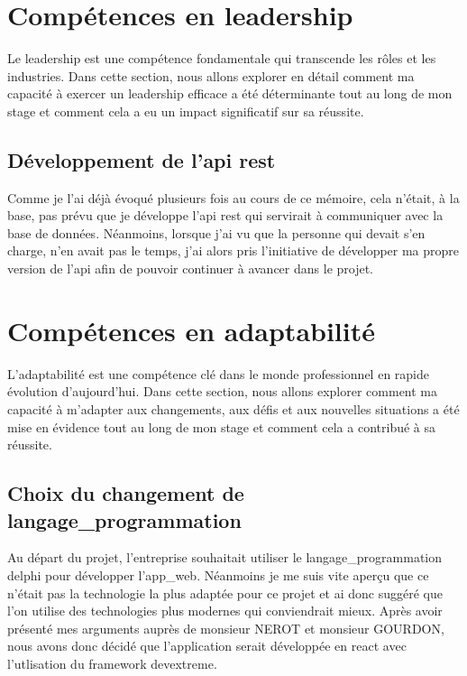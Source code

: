 \documentclass[a4paper, 12pt, french]{article}
\begin{document}
			\section{Compétences en leadership}
				Le leadership est une compétence fondamentale qui transcende les rôles et les industries. Dans cette section, nous allons explorer en détail comment ma capacité à exercer un leadership efficace a été déterminante tout au long de mon stage et comment cela a eu un impact significatif sur sa réussite.

				\subsection{Développement de l'\acrshort{api} \acrshort{rest}}
					Comme je l'ai déjà évoqué plusieurs fois au cours de ce mémoire, cela n'était, à la base, pas prévu que je développe l'\acrshort{api} \acrshort{rest} qui servirait à communiquer avec la base de données. Néanmoins, lorsque j'ai vu que la personne qui devait s'en charge, n'en avait pas le temps, j'ai alors pris l'initiative de développer ma propre version de l'\acrshort{api} afin de pouvoir continuer à avancer dans le projet.
			
			\section{Compétences en adaptabilité}
				L'adaptabilité est une compétence clé dans le monde professionnel en rapide évolution d'aujourd'hui. Dans cette section, nous allons explorer comment ma capacité à m'adapter aux changements, aux défis et aux nouvelles situations a été mise en évidence tout au long de mon stage et comment cela a contribué à sa réussite.
				
				\subsection{Choix du changement de \gls{langage_programmation}}
					Au départ du projet, l'entreprise souhaitait utiliser le \gls{langage_programmation} \gls{delphi} pour développer l'\gls{app_web}. Néanmoins je me suis vite aperçu que ce n'était pas la technologie la plus adaptée pour ce projet et ai donc suggéré que l'on utilise des technologies plus modernes qui conviendrait mieux. Après avoir présenté mes arguments auprès de monsieur NEROT et monsieur GOURDON, nous avons donc décidé que l'application serait développée en \gls{react} avec l'utlisation du \gls{framework} \gls{devextreme}.
			
\end{document}
